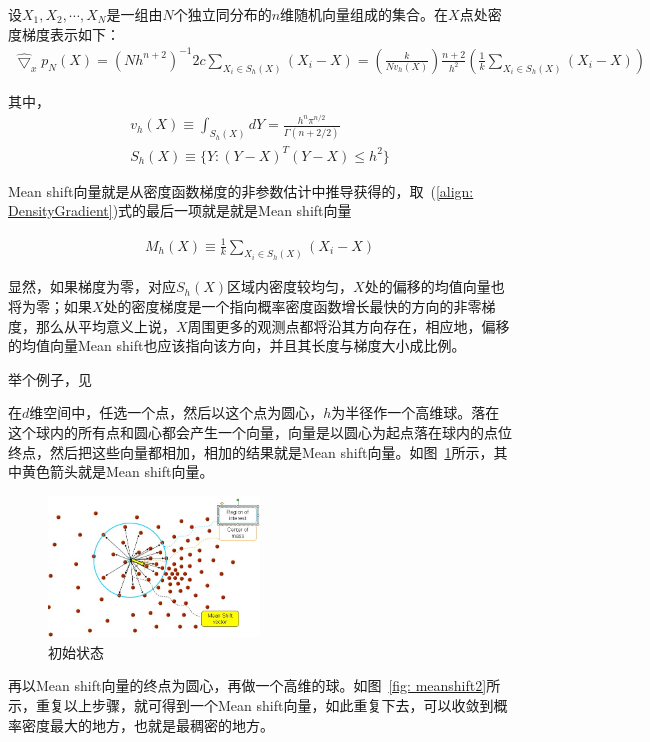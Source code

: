 \documentclass[12pt]{article}
\begin{document}
设$X_1, X_2, \cdots, X_N$是一组由$N$个独立同分布的$n$维随机向量组成的集合。在$X$点处密度梯度表示如下：
\begin{align}
\label{align: DensityGradient}
\hat{\bigtriangledown}_x p_N(X) = (Nh^{n+2})^{-1}2c \sum_{X_i \in S_h(X)} (X_i - X) = \left(\frac{k}{Nv_h(X)}\right) \frac{n+2}{h^2} \left(\frac{1}{k} \sum_{X_i \in S_h(X)} (X_i - X)\right)
\end{align}

其中，
\begin{align}
v_h(X) \equiv \int_{S_h(X)}dY = \frac{h^n\pi^{n/2}}{\Gamma(n+2/2)}\\
S_h(X) \equiv \{Y:(Y-X)^T(Y-X) \le h^2\}
\end{align}

Mean shift向量就是从密度函数梯度的非参数估计中推导获得的，取~(\ref{align: DensityGradient})式的最后一项就是就是Mean shift向量

\begin{align}
M_h(X) \equiv \frac{1}{k} \sum_{X_i \in S_h(X)} (X_i-X)
\end{align}

显然，如果梯度为零，对应$S_h(X)$区域内密度较均匀，$X$处的偏移的均值向量也将为零；如果$X$处的密度梯度是一个指向概率密度函数增长最快的方向的非零梯度，那么从平均意义上说，$X$周围更多的观测点都将沿其方向存在，相应地，偏移的均值向量Mean shift也应该指向该方向，并且其长度与梯度大小成比例。

举个例子，见\cite{MeanShiftExample}

在$d$维空间中，任选一个点，然后以这个点为圆心，$h$为半径作一个高维球。落在这个球内的所有点和圆心都会产生一个向量，向量是以圆心为起点落在球内的点位终点，然后把这些向量都相加，相加的结果就是Mean shift向量。如图~\ref{fig: meanshift1}所示，其中黄色箭头就是Mean shift向量。

\begin{figure}[!ht]
\centering
\includegraphics[width=0.5\textwidth]{meanshift1.jpg}
\caption{初始状态}
\label{fig: meanshift1}
\end{figure} 


再以Mean shift向量的终点为圆心，再做一个高维的球。如图~\ref{fig: meanshift2}所示，重复以上步骤，就可得到一个Mean shift向量，如此重复下去，可以收敛到概率密度最大的地方，也就是最稠密的地方。
\end{document}
